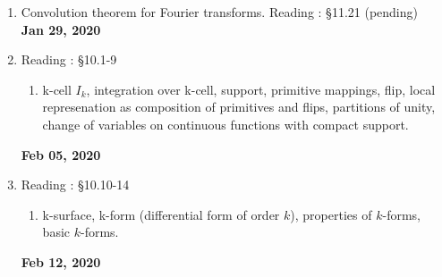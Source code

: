 \begin{enumerate}[label=Week \arabic*]
\begin{enumerate}[label=Day \arabic*]
			\item Extrema of functions on several variables. Reading : \S13.6
		\end{enumerate}
		\textbf{Jan 22, 2020}
	\item Convolution theorem for Fourier transforms. Reading : \S 11.21 (pending)\\
		\textbf{Jan 29, 2020}
	\item  Reading : \S10.1-9
		\begin{enumerate}[label=Day \arabic*]
			\item k-cell $I_k$, integration over k-cell, support, primitive mappings, flip, local represenation as composition of primitives and flips, partitions of unity, change of variables on continuous functions with compact support. 
		\end{enumerate}
		\textbf{Feb 05, 2020}
	\item  Reading : \S10.10-14
		\begin{enumerate}[label=Day \arabic*]
			\item k-surface, k-form (differential form of order $k$), properties of $k$-forms, basic $k$-forms.
		\end{enumerate}
		\textbf{Feb 12, 2020}
\end{enumerate}
